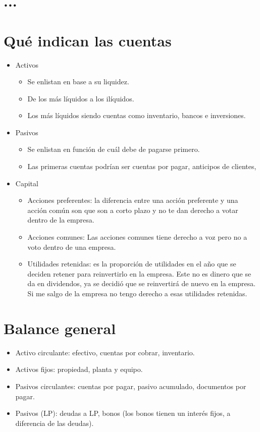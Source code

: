 \section{...}


\section{Qué indican las cuentas}
\begin{itemize}
    \item Activos
        \begin{itemize}
            \item Se enlistan en base a su liquidez.
            \item De los más líquidos a los ilíquidos.
            \item Los más líquidos siendo cuentas como inventario, bancos e inversiones.
        \end{itemize}
    
    \item Pasivos 
        \begin{itemize}
            \item Se enlistan en función de cuál debe de pagarse primero.
            \item Las primeras cuentas podrían ser cuentas por pagar, anticipos de clientes, 
        \end{itemize}
    
    \item Capital 
        \begin{itemize}
            \item Acciones preferentes: la diferencia entre una acción preferente y una acción común son que son a corto plazo y no te dan derecho a votar dentro de la empresa. 
            \item Acciones comunes: Las acciones comunes tiene derecho a voz pero no a voto dentro de una empresa.
            \item Utilidades retenidas: es la proporción de utilidades en el año que se deciden retener para reinvertirlo en la empresa. Este no es dinero que se da en dividendos, ya se decidió que se reinvertirá de nuevo en la empresa. Si me salgo de la empresa no tengo derecho a esas utilidades retenidas. 
        \end{itemize}
\end{itemize}

\section{Balance general}
\begin{itemize}
    \item Activo circulante: efectivo, cuentas por cobrar, inventario. 
    \item Activos fijos: propiedad, planta y equipo. 
    \item Pasivos circulantes: cuentas por pagar, pasivo acumulado, documentos por pagar. 
    \item Pasivos (LP): deudas a LP, bonos (los bonos tienen un interés fijos, a diferencia de las deudas). 
\end{itemize}


